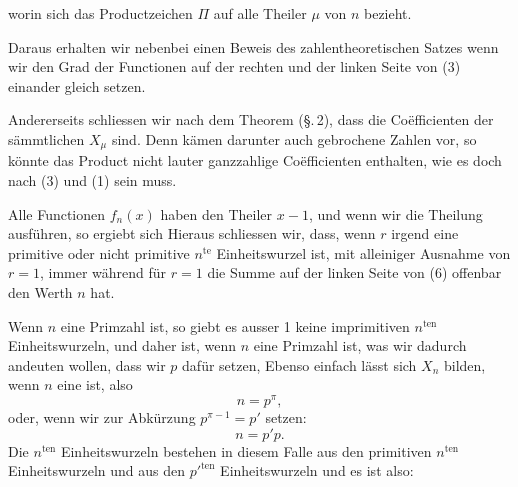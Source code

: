 worin sich das Productzeichen $\Pi$ auf alle Theiler $\mu$ von $n$
bezieht.

Daraus erhalten wir nebenbei einen Beweis des zahlentheoretischen
Satzes
wenn wir den Grad der Functionen auf der rechten und der
linken Seite von (3) einander gleich setzen.

Andererseits schliessen wir nach dem  Theorem
(\S.\,2), dass die Co\"efficienten der s\"ammtlichen $X_\mu$ 
sind. Denn k\"amen darunter auch gebrochene Zahlen vor, so
k\"onnte das Product nicht lauter ganzzahlige Co\"efficienten enthalten, wie es doch nach (3) und (1) sein muss.

Alle Functionen $f_n(x)$ haben den Theiler $x-1$, und wenn
wir die Theilung ausf\"uhren, so ergiebt sich
Hieraus schliessen wir, dass, wenn $r$ irgend eine primitive
oder nicht primitive $n^{\text{te}}$ Einheitswurzel ist, mit alleiniger Ausnahme von $r=1$, immer
w\"ahrend f\"ur $r=1$ die Summe auf der linken Seite von (6)
offenbar den Werth $n$ hat.

Wenn $n$ eine Primzahl ist, so giebt es ausser 1 keine imprimitiven $n^{\text{ten}}$ Einheitswurzeln, und daher ist, wenn $n$ eine Primzahl ist, was wir dadurch andeuten wollen, dass wir $p$ daf\"ur
setzen,
Ebenso einfach l\"asst sich $X_n$ bilden, wenn $n$ eine  ist, also
\[
n = p^{\pi},
\]
oder, wenn wir zur Abk\"urzung $p^{\pi-1} = p'$ setzen:
\[
n = p'p.
\]
Die $n^{\text{ten}}$ Einheitswurzeln bestehen in diesem Falle aus den
primitiven $n^{\text{ten}}$ Einheitswurzeln und aus den $p'^{\text{ten}}$ Einheitswurzeln
und es ist also:
